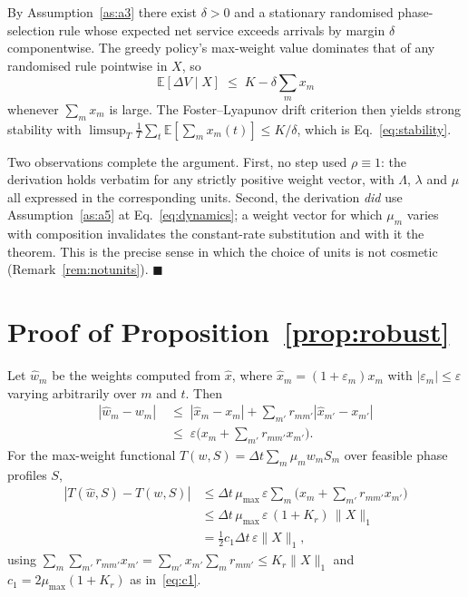 \documentclass[journal]{IEEEtran}
\begin{document}
By Assumption~\ref{as:a3} there exist $\delta>0$ and a stationary
randomised phase-selection rule whose expected net service exceeds
arrivals by margin $\delta$ componentwise. The greedy policy's max-weight
value dominates that of any randomised rule pointwise in $X$, so
\begin{equation}
\mathbb{E}[\Delta V \mid X] \;\le\; K - \delta \sum_m x_m
\end{equation}
whenever $\sum_m x_m$ is large. The Foster--Lyapunov drift criterion then
yields strong stability with
$\limsup_T \frac1T\sum_t \mathbb{E}[\sum_m x_m(t)] \le K/\delta$, which
is Eq.~\eqref{eq:stability}.

Two observations complete the argument. First, no step used
$\rho\equiv1$: the derivation holds verbatim for any strictly positive
weight vector, with $\Lambda$, $\lambda$ and $\mu$ all expressed in the
corresponding units. Second, the derivation \emph{did} use
Assumption~\ref{as:a5} at Eq.~\eqref{eq:dynamics}; a weight vector for
which $\mu_m$ varies with composition invalidates the constant-rate
substitution and with it the theorem. This is the precise sense in which
the choice of units is not cosmetic (Remark~\ref{rem:notunits}).
\hfill$\blacksquare$

\section{Proof of Proposition~\ref{prop:robust}}
\label{app:prop1}
Let $\hat w_m$ be the weights computed from $\hat x$, where
$\hat x_m = (1+\varepsilon_m) x_m$ with $|\varepsilon_m| \le \varepsilon$
varying arbitrarily over $m$ and $t$. Then
\begin{equation}
\begin{aligned}
|\hat w_m - w_m| &\;\le\; |\hat x_m - x_m|
 + \sum_{m'} r_{mm'} |\hat x_{m'} - x_{m'}|\\
 &\;\le\; \varepsilon\Big( x_m + \sum_{m'} r_{mm'} x_{m'}\Big).
\end{aligned}
\end{equation}
For the max-weight functional
$T(w,S) = \Delta t \sum_m \mu_m w_m S_m$ over feasible phase profiles
$S$,
\begin{align}
|T(\hat w,S) - T(w,S)|
&\le \Delta t\, \mu_{\max}\, \varepsilon
   \sum_m \Big( x_m + \sum_{m'} r_{mm'} x_{m'} \Big) \nonumber\\
&\le \Delta t\, \mu_{\max}\, \varepsilon\, (1+K_r)\, \|X\|_1 \nonumber\\
&= \tfrac12 c_1 \Delta t\, \varepsilon \|X\|_1,
\end{align}
using $\sum_m \sum_{m'} r_{mm'} x_{m'} = \sum_{m'} x_{m'}\sum_m r_{mm'}
\le K_r \|X\|_1$ and $c_1 = 2\mu_{\max}(1+K_r)$ as in~\eqref{eq:c1}.
\end{document}

